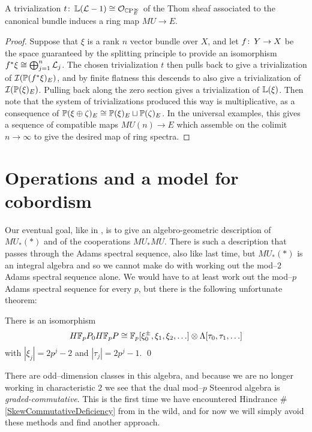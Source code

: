 \begin{theorem}\label{ComplexOrientationsInTermsOfTrivs}
A trivialization $t\co \ThomSheaf{\L - 1} \cong \sheaf O_{\CP^\infty_E}$ of the Thom sheaf associated to the canonical bundle induces a ring map $MU \to E$.
\end{theorem}
\begin{proof}
Suppose that $\xi$ is a rank $n$ vector bundle over $X$, and let $f\co Y \to X$ be the space guaranteed by the splitting principle to provide an isomorphism $f^* \xi \cong \bigoplus_{j=1}^n \L_j$.  The chosen trivialization $t$ then pulls back to give a trivialization of $\sheaf I(\P(f^* \xi)_E)$, and by finite flatness this descends to also give a trivialization of $\sheaf I(\P(\xi)_E)$.  Pulling back along the zero section gives a trivialization of $\ThomSheaf{\xi}$.  Then note that the system of trivializations produced this way is multiplicative, as a consequence of $\P(\xi \oplus \zeta)_E \cong \P(\xi)_E \sqcup \P(\zeta)_E$.  In the universal examples, this gives a sequence of compatible maps $MU(n) \to E$ which assemble on the colimit $n \to \infty$ to give the desired map of ring spectra.
\end{proof}













\section{Operations and a model for cobordism}

Our eventual goal, like in , is to give an algebro-geometric description of $MU_*(*)$ and of the cooperations $MU_* MU$.  There is such a description that passes through the Adams spectral sequence, also like last time, but $MU_*(*)$ is an integral algebra and so we cannot make do with working out the mod--$2$ Adams spectral sequence alone.  We would have to at least work out the mod--$p$ Adams spectral sequence for every $p$, but there is the following unfortunate theorem:
\begin{theorem}
There is an isomorphism
\[H\F_pP_0 H\F_pP \cong \F_p[\xi_0^\pm, \xi_1, \xi_2, \ldots] \otimes \Lambda[\tau_0, \tau_1, \ldots]\]
with $|\xi_j| = 2p^j-2$ and $|\tau_j| = 2p^j - 1$. \qed
\end{theorem}
\noindent There are odd--dimension classes in this algebra, and because we are no longer working in characteristic $2$ we see that the dual mod--$p$ Steenrod algebra is \emph{graded-commutative}.  This is the first time we have encountered Hindrance \#\ref{SkewCommutativeDeficiency} from  in the wild, and for now we will simply avoid these methods and find another approach.

